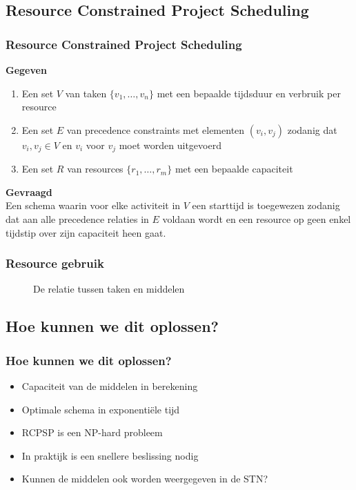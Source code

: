 \documentclass{beamer}
\theoremstyle{definition}
\newcommand{\inputtikz}[1]{}
\begin{document}
\subsection{Resource Constrained Project Scheduling}
\begin{frame}
	\frametitle{Resource Constrained Project Scheduling}
	\textbf{Gegeven}
	\begin{enumerate}
		\item Een set $V$ van taken $\{v_1,\dots,v_n\}$ met een bepaalde tijdsduur en verbruik per resource
		\item Een set $E$ van precedence constraints met elementen $(v_i, v_j)$ zodanig dat $v_i, v_j \in V$ en $v_i$ voor $v_j$ moet worden uitgevoerd
		\item Een set $R$ van resources $\{r_1, \ldots, r_m\}$ met een bepaalde capaciteit
	\end{enumerate}
	
	\textbf{Gevraagd}\\
	Een schema waarin voor elke activiteit in $V$ een starttijd is toegewezen zodanig dat aan alle precedence relaties in $E$ voldaan wordt en een resource op geen enkel tijdstip over zijn capaciteit heen gaat.
\end{frame}

\begin{frame}
	\frametitle{Resource gebruik}
	\vspace{-.2em}
	\begin{figure}[ht]
		\makebox[\textwidth][c]{\resizebox{.7\paperwidth}{!}{
			\inputtikz{usage_nl}
		}}
		\vspace{-1em}
		\caption{De relatie tussen taken en middelen}
		\label{fig:activity_graph}
	\end{figure}
\end{frame}


\subsection{Hoe kunnen we dit oplossen?}
\begin{frame}
	\frametitle{Hoe kunnen we dit oplossen?}
	\begin{itemize}
		\item Capaciteit van de middelen in berekening
		\item Optimale schema in exponenti\"{e}le tijd
		\item RCPSP is een NP-hard probleem
		\item In praktijk is een snellere beslissing nodig
		\item Kunnen de middelen ook worden weergegeven in de STN?
	\end{itemize}
\end{frame}
\end{document}
